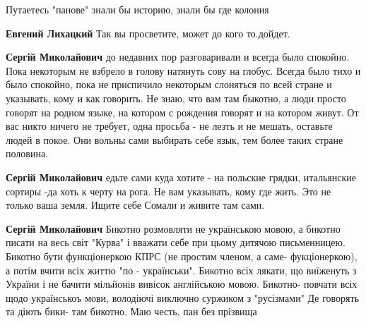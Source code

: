 \begin{itemize}
\begin{itemize}
 
Путаетесь "панове" знали бы историю, знали бы где колония

 
\textbf{Евгений Лихацкий} Так вы просветите, может до кого то.дойдет.

 
\textbf{Сергій Миколайович} до недавних пор разговаривали и всегда было
спокойно. Пока некоторым не взбрело в голову натянуть сову на глобус. Всегда
было тихо и было спокойно, пока не приспичило некоторым слоняться по всей
стране и указывать, кому и как говорить. Не знаю, что вам там быкотно, а люди
просто говорят на родном языке, на котором с рождения говорят и на котором
живут. От вас никто ничего не требует, одна просьба - не лезть и не мешать,
оставьте людей в покое. Они вольны сами выбирать себе язык, тем более таких
стране половина.

 
\textbf{Сергій Миколайович} едьте сами куда хотите - на польские грядки,
итальянские сортиры -да хоть к черту на рога. Не вам указывать, кому где жить.
Это не только ваша земля. Ищите себе Сомали и живите там сами.

 
\textbf{Сергій Миколайович} Бикотно розмовляти не українською мовою, а бикотно
писати на весь світ "Курва" і вважати себе при цьому дитячою письменницею.
Бикотно бути функціонеркою КПРС (не простим членом, а саме- фукціонеркою), а
потім вчити всіх життю "по - українськи". Бикотно всіх лякати, що виїженуть з
України і не бачити мільйонів вивісок англійською мовою. Бикотно- повчати всіх
щодо українськоъ мови, володіючі виключно суржиком з "русізмами" Де говорять та
діють бики- там бикотно. Маю честь, пан без прізвища


\end{itemize}
\end{itemize}
